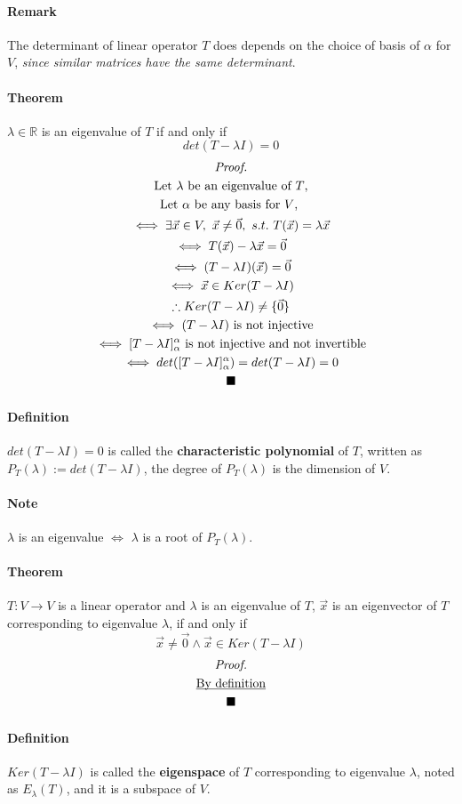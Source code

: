 \documentclass[11pt]{article}
\newcommand{\trans}[3]{{#1}: {#2} \to {#3}}
\newcommand{\R}[0]{\mathbb{R}}
\newcommand{\tmat}[3]{[{#1}]_{{#2}}^{{#3}}}
\newcommand{\definition}[0]{\paragraph{Definition}}
\newcommand{\theorem}[0]{\paragraph{Theorem}}
\newcommand{\tx}[1]{\text{{#1}}}
\begin{document}
	\paragraph{Remark} The determinant of linear operator $T$ does  depends on the choice of basis of $\alpha$ for $V$, \emph{since similar matrices have the same determinant}.
	\theorem $\lambda \in \R$ is an eigenvalue of $T$ if and only if
	\[
		det(T - \lambda I) = 0
	\] 
	\begin{multline*}
		\emph{Proof.} \\
		\text{Let $\lambda$ be an eigenvalue of $T$,} \\
		\tx{Let $\alpha$ be any basis for $V$, } \\
		\iff \exists \vec{x} \in V,\ \vec{x} \neq \vec{0},\ s.t.\ T(\vec{x}) = \lambda \vec{x} \\
		\iff T(\vec{x}) - \lambda \vec{x} = \vec{0} \\
		\iff (T - \lambda I)(\vec{x}) = \vec{0} \\
		\iff \vec{x} \in Ker(T - \lambda I) \\
		\therefore Ker(T - \lambda I) \neq \{\vec{0}\} \\
		\iff (T-\lambda I) \text{ is not injective} \\
		\iff \tmat{T - \lambda I}{\alpha}{\alpha} \text{ is not injective and not invertible} \\
		\iff det(\tmat{T - \lambda I}{\alpha}{\alpha}) = det(T - \lambda I) = 0 \\
		\blacksquare
	\end{multline*}
	\definition $det(T - \lambda I) = 0$ is called the \textbf{characteristic polynomial} of $T$, written as $P_T(\lambda) := det(T - \lambda I)$, the degree of $P_T(\lambda)$ is the dimension of $V$.
	\paragraph{Note} $\lambda$ is an eigenvalue $\iff$ $\lambda$ is a root of $P_T(\lambda)$.
	
	\theorem $\trans{T}{V}{V}$ is a linear operator and $\lambda$ is an eigenvalue of $T$, $\vec{x}$ is an eigenvector of $T$ corresponding to eigenvalue $\lambda$, if and only if
	\[
		\vec{x} \neq \vec{0} \land \vec{x} \in Ker(T - \lambda I)
	\]
	\begin{multline*}
		\emph{Proof.} \\
		\underbar{By definition} \\
		\blacksquare
	\end{multline*}
	\definition $Ker(T - \lambda I)$ is called the \textbf{eigenspace} of $T$ corresponding to eigenvalue $\lambda$, noted as $E_\lambda(T)$, and it is a subspace of $V$.
\end{document}
